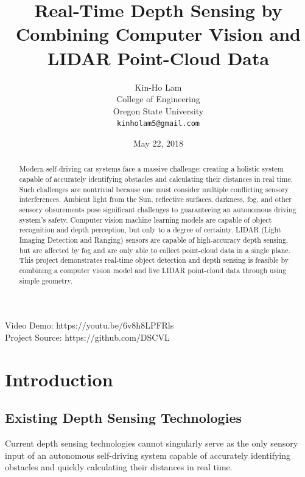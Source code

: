 \documentclass{article}
\title{Real-Time Depth Sensing by Combining Computer Vision and LIDAR Point-Cloud Data}
\date{May 22, 2018}
\author{
  Kin-Ho Lam\\
  College of Engineering\\
  Oregon State University \\
  \texttt{kinholam5@gmail.com}\\
}
\begin{document}
\maketitle

\begin{abstract}
  Modern self-driving car systems face a massive challenge: creating a holistic system capable of accurately identifying obstacles and calculating their distances in real time.
  Such challenges are nontrivial because one must consider multiple conflicting sensory interferences.
  Ambient light from the Sun, reflective surfaces, darkness, fog, and other sensory obsurements pose significant challenges to guaranteeing an autonomous driving system's safety.
  Computer vision machine learning models are capable of object recognition and depth perception, but only to a degree of certainty.
  LIDAR (Light Imaging Detection and Ranging) sensors are capable of high-accuracy depth sensing, but are affected by fog and are only able to collect point-cloud data in a single plane.
  This project demonstrates real-time object detection and depth sensing is feasible by combining a computer vision model and live LIDAR point-cloud data through using simple geometry.
\end{abstract}
\begin{center}
  Video Demo: https://youtu.be/6v8h8LPFRls \\ Project Source: https://github.com/DSCVL \\
\end{center}

\section{Introduction}
    \subsection{Existing Depth Sensing Technologies}
      Current depth sensing technologies cannot singularly serve as the only sensory input of an autonomous self-driving system capable of accurately identifying obstacles and quickly calculating their distances in real time.
\end{document}
